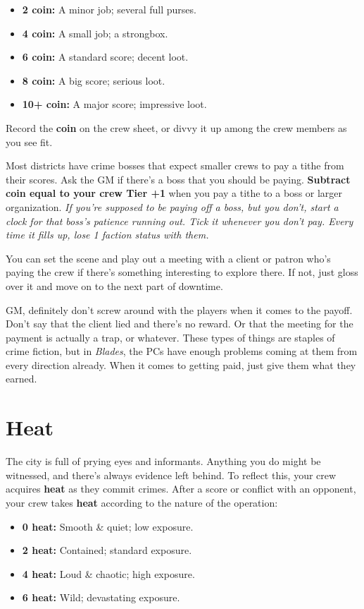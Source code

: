 \documentclass[11pt,oneside]{book}
\newcommand{\gameterm}[1]{\textbf{#1}}
\begin{document}
\begin{itemize}
	\item \gameterm{2 coin:}  A minor job; several full purses.
	\item \gameterm{4 coin:}  A small job; a strongbox.
	\item \gameterm{6 coin:}  A standard score; decent loot.
	\item \gameterm{8 coin:}  A big score; serious loot.
	\item \gameterm{10+ coin:}  A major score; impressive loot.
\end{itemize}

Record the \gameterm{coin}  on the crew sheet, or divvy it up among the crew members as you see fit.

Most districts have crime bosses that expect smaller crews to pay a tithe from their scores. Ask the GM if there’s a boss that you should be paying. \textbf{Subtract \gameterm{coin}  equal to your crew Tier +1} when you pay a tithe to a boss or larger organization. \emph{If you’re supposed to be paying off a boss, but you don’t, start a clock for that boss’s patience running out. Tick it whenever you don’t pay. Every time it fills up, lose 1 faction status with them.}

You can set the scene and play out a meeting with a client or patron who’s paying the crew if there’s something interesting to explore there. If not, just gloss over it and move on to the next part of downtime.

GM, definitely don’t screw around with the players when it comes to the payoff. Don’t say that the client lied and there’s no reward. Or that the meeting for the payment is actually a trap, or whatever. These types of things are staples of crime fiction, but in \emph{Blades}, the PCs have enough problems coming at them from every direction already. When it comes to getting paid, just give them what they earned.

\chapter{Heat}

The city is full of prying eyes and informants. Anything you do might be witnessed, and there’s always evidence left behind. To reflect this, your crew acquires \gameterm{heat}  as they commit crimes. After a score or conflict with an opponent, your crew takes \gameterm{heat}  according to the nature of the operation:

\begin{itemize}
	\item \gameterm{0 heat:}  Smooth \& quiet; low exposure.
	\item \gameterm{2 heat:}  Contained; standard exposure.
	\item \gameterm{4 heat: } Loud \& chaotic; high exposure.
	\item \gameterm{6 heat:}  Wild; devastating exposure.
\end{itemize}
\end{document}
